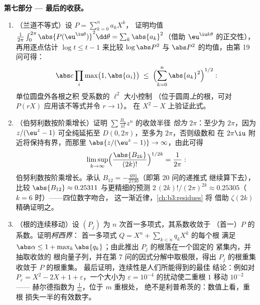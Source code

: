 \begin{problem}
\medskip
\noindent\textbf{第七部分 --- 最后的收获。}
\begin{enumerate}[resume]
  \item （兰道不等式）设 $P = \sum_{k=0}^na_kX^k$，
        证明均值 $\frac1{2\pi}\int_0^{2\pi}
        \abs{P(\eu^{\iu\theta})}^2\dd\theta =
        \sum_k\abs{a_k}^2$（借助
        $\eu^{\iu k\theta}$ 的正交性），再用逐点估计
        $\log t \leq t - 1$ 来比较
        $\log\abs P^2$ 与 $\abs P^2$ 的均值，由第
        19 问可得：
        \[
        \abs c\prod_{i}\max\bigl(1, \abs{\alpha_i}\bigr)
        \;\leq\;
        \Bigl(\sum_{k=0}^{n}\abs{a_k}^2\Bigr)^{1/2} :
        \]
        单位圆盘外各根之积
        受系数的 $\ell^2$ 大小控制
        （位于圆周\emph{上}的根，可对
        $P(rX)$ 应用该不等式并令 $r \to 1$）。
        在 $X^2 - X$ 上验证此式。
  \item （伯努利数按阶乘增长）证明
        $\sum\frac{B_n}{n!}z^n$ 的收敛半径
        \emph{恰为} $2\pi$：至少为 $2\pi$，因为
        $z/(\eu^z - 1)$ 可全纯延拓至
        $D(0, 2\pi)$，至多为 $2\pi$，否则级数和
        在 $2\pi\iu$ 附近将保持有界，而那里
        $\abs{z/(\eu^z-1)} \to \infty$，由此可得
        \[
        \limsup_{k\to\infty}
        \Bigl(\frac{\abs{B_{2k}}}{(2k)!}\Bigr)^{1/2k}
        = \frac1{2\pi} :
        \]
        伯努利数按阶乘增长。承认 $B_{12}
        = -\frac{691}{2730}$（即第 20 问的递推式
        继续算下去），比较 $\abs{B_{12}} \approx 0.25311$
        与更精细的预测 $2\,(2k)!/(2\pi)^{2k}
        \approx 0.25305$（$k = 6$ 时）——四位数字吻合，
        这一渐近律，\cref{ch:b3:residues} 将
        借助 $\zeta(2k)$ 精确证明之。
  \item （根的连续移动）设 $(P_j)$ 为
        $n$ 次首一多项式，其系数收敛于
        （首一）$P$ 的系数。证明\emph{柯西界}：
        首一多项式 $Q = X^n + \sum_{k<n}q_kX^k$ 的每个根
        满足 $\abs\alpha \leq 1 + \max_k\abs{q_k}$；由此推出
        $P_j$ 的根落在一个固定的
        紧集内，并抽取收敛的
        根向量子列，并在第
        7 问的因式分解中取极限，得出
        $P_j$ 的根重集收敛于 $P$ 的根重集。
        最后证明，连续性是人们所能得到的最佳
        结论：例如对 $P_\varepsilon = X^2 - 2X + 1 +
        \varepsilon$，一个大小为 $\varepsilon =
        10^{-4}$ 的扰动使二重根 $1$ 移动 $10^{-2}$ ——
        赫尔德指数为 $\frac1m$，位于 $m$ 重根处，
        绝不是利普希茨的：数值上看，重根
        损失一半的有效数字。
\end{enumerate}
\end{problem}
